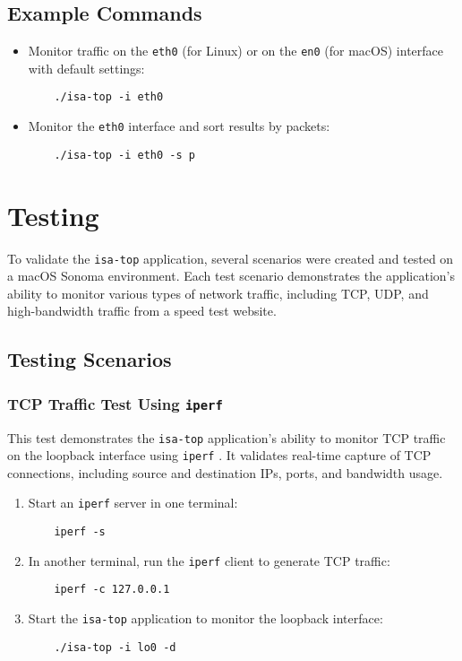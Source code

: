 \documentclass[12pt]{extarticle}
\begin{document}
\subsection{Example Commands}
\begin{itemize}
    \item Monitor traffic on the \texttt{eth0} (for Linux) or on the \texttt{en0} (for macOS) interface with default settings:
    \begin{verbatim}
    ./isa-top -i eth0
    \end{verbatim}

    \item Monitor the \texttt{eth0} interface and sort results by packets:
    \begin{verbatim}
    ./isa-top -i eth0 -s p
    \end{verbatim}

\end{itemize}

\section{Testing}

To validate the \texttt{isa-top} application, several scenarios were created and tested on a macOS Sonoma environment. Each test scenario demonstrates the application’s ability to monitor various types of network traffic, including TCP, UDP, and high-bandwidth traffic from a speed test website.

\subsection{Testing Scenarios}

\subsubsection{TCP Traffic Test Using \texttt{iperf}}

This test demonstrates the \texttt{isa-top} application’s ability to monitor TCP traffic on the loopback interface using \texttt{iperf} \cite{iperf}. It validates real-time capture of TCP connections, including source and destination IPs, ports, and bandwidth usage.

\begin{enumerate}
    \item Start an \texttt{iperf} server in one terminal:
    \begin{verbatim}
    iperf -s
    \end{verbatim}
    \item In another terminal, run the \texttt{iperf} client to generate TCP traffic:
    \begin{verbatim}
    iperf -c 127.0.0.1
    \end{verbatim}
    \item Start the \texttt{isa-top} application to monitor the loopback interface:
    \begin{verbatim}
    ./isa-top -i lo0 -d
    \end{verbatim}
\end{enumerate}
\end{document}
